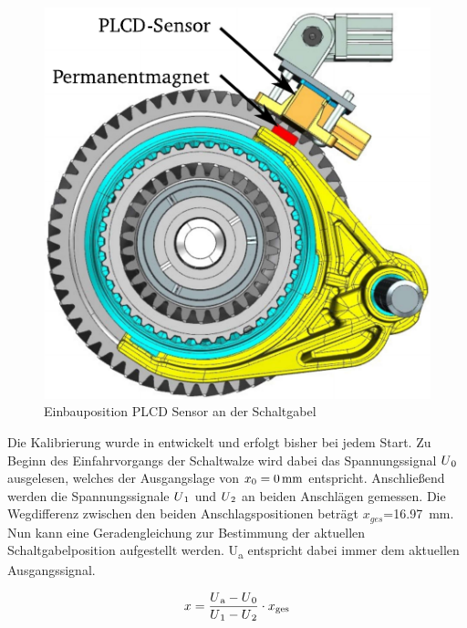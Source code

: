 \begin{figure}[h]
	\centering
		\includegraphics{Bilder/Sensor.pdf}
	\caption{Einbauposition PLCD Sensor an der Schaltgabel \cite[S.14]{adp}}
	\label{fig:Sensor}
\end{figure}
Die Kalibrierung wurde in \cite[S.24f]{messtechnik} entwickelt und erfolgt bisher bei jedem Start. Zu Beginn des Einfahrvorgangs der Schaltwalze wird dabei das Spannungssignal $U\textsubscript{0}$ ausgelesen, welches der Ausgangslage von $x\textsubscript{0}=\SI{0}{mm}$ entspricht. Anschließend werden die Spannungssignale $U\textsubscript{1}$ und $U\textsubscript{2}$ an beiden Anschlägen gemessen. Die Wegdifferenz zwischen den beiden Anschlagspositionen beträgt $x_{ges}$=\SI{16,97}{mm}. Nun kann eine Geradengleichung zur Bestimmung der aktuellen Schaltgabelposition aufgestellt werden. U\textsubscript{a} entspricht dabei immer dem aktuellen Ausgangssignal.

\begin{equation}\label{eq:Lage}
	x=\frac{U\textsubscript{a} -U\textsubscript{0}}{U\textsubscript{1}-U\textsubscript{2}}\cdot x\textsubscript{ges}
\end{equation}


